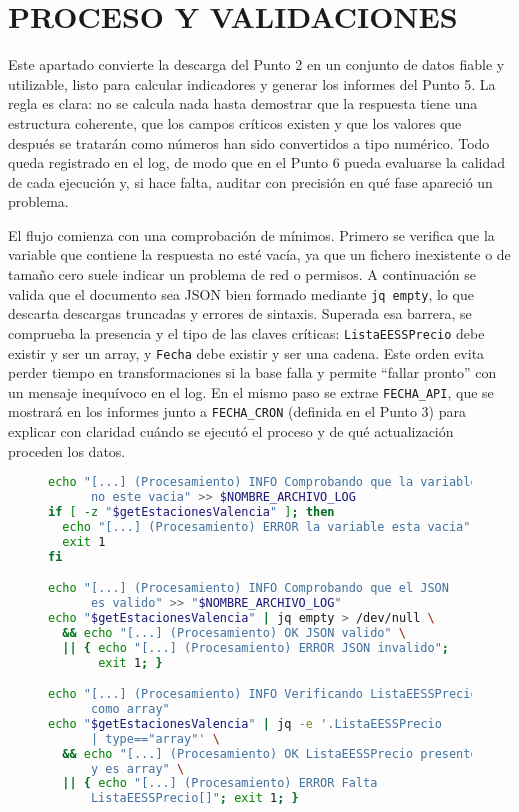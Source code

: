 \chapter{PROCESO Y VALIDACIONES}

Este apartado convierte la descarga del Punto 2 en un conjunto de datos fiable y utilizable, listo para calcular indicadores y generar los informes del Punto 5. La regla es clara: no se calcula nada hasta demostrar que la respuesta tiene una estructura coherente, que los campos críticos existen y que los valores que después se tratarán como números han sido convertidos a tipo numérico. Todo queda registrado en el log, de modo que en el Punto 6 pueda evaluarse la calidad de cada ejecución y, si hace falta, auditar con precisión en qué fase apareció un problema.

El flujo comienza con una comprobación de mínimos. Primero se verifica que la variable que contiene la respuesta no esté vacía, ya que un fichero inexistente o de tamaño cero suele indicar un problema de red o permisos. A continuación se valida que el documento sea JSON bien formado mediante \texttt{jq empty}, lo que descarta descargas truncadas y errores de sintaxis. Superada esa barrera, se comprueba la presencia y el tipo de las claves críticas: \texttt{ListaEESSPrecio} debe existir y ser un array, y \texttt{Fecha} debe existir y ser una cadena. Este orden evita perder tiempo en transformaciones si la base falla y permite ``fallar pronto'' con un mensaje inequívoco en el log. En el mismo paso se extrae \texttt{FECHA\_API}, que se mostrará en los informes junto a \texttt{FECHA\_CRON} (definida en el Punto 3) para explicar con claridad cuándo se ejecutó el proceso y de qué actualización proceden los datos.

\begin{figure}[H]
  \begin{lstlisting}[language=bash, caption={Figura 4.1 — Validación inicial del JSON}]
echo "[...] (Procesamiento) INFO Comprobando que la variable 
      no este vacia" >> $NOMBRE_ARCHIVO_LOG
if [ -z "$getEstacionesValencia" ]; then
  echo "[...] (Procesamiento) ERROR la variable esta vacia"
  exit 1
fi

echo "[...] (Procesamiento) INFO Comprobando que el JSON 
      es valido" >> "$NOMBRE_ARCHIVO_LOG"
echo "$getEstacionesValencia" | jq empty > /dev/null \
  && echo "[...] (Procesamiento) OK JSON valido" \
  || { echo "[...] (Procesamiento) ERROR JSON invalido"; 
       exit 1; }

echo "[...] (Procesamiento) INFO Verificando ListaEESSPrecio 
      como array"
echo "$getEstacionesValencia" | jq -e '.ListaEESSPrecio 
      | type=="array"' \
  && echo "[...] (Procesamiento) OK ListaEESSPrecio presente 
      y es array" \
  || { echo "[...] (Procesamiento) ERROR Falta 
      ListaEESSPrecio[]"; exit 1; }
\end{lstlisting}
\end{figure}


